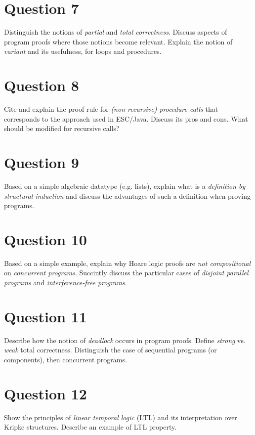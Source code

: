 \documentclass{article}
\begin{document}
  \section{Question 7}
  Distinguish the notions of \textit{partial} and \textit{total correctness}.
  Discuss aspects of program proofs where those notions become relevant. Explain
  the notion of \textit{variant} and its usefulness, for loops and procedures.
  \newline

  \section{Question 8}
  Cite and explain the proof rule for \textit{(non-recursive) procedure calls}
  that corresponds to the approach used in ESC/Java. Discuss its pros and cons.
  What should be modified for recursive calls? \newline
  \section{Question 9}
  Based on a simple algebraic datatype (e.g. lists), explain what is a \textit{
  definition by structural induction} and discuss the advantages of such a
  definition when proving programs. \newline
  \section{Question 10}
  Based on a simple example, explain why Hoare logic proofs are \textit{not
  compositional} on \textit{concurrent programs}. Succintly discuss the
  particular cases of \textit{disjoint parallel programs} and \textit{
  interference-free programs}. \newline
  \section{Question 11}
  Describe how the notion of \textit{deadlock} occurs in program proofs. Define
  \textit{strong} vs. \textit{weak} total correctness. Distinguish the case
  of sequential programs (or components), then concurrent programs. \newline
  \section{Question 12}
  Show the principles of \textit{linear temporal logic} (LTL) and its
  interpretation over Kripke structures. Describe an example of LTL property.
  \newline
\end{document}
